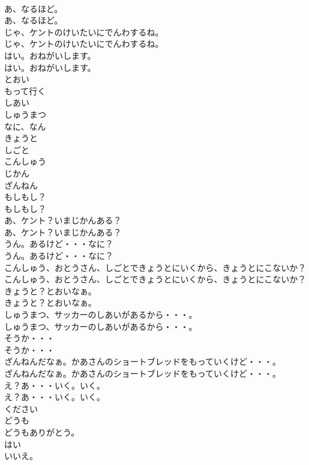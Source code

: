 \documentclass[8pt]{extreport}
\begin{document}
\begin{CJK}{UTF8}{min}
\\	あ、なるほど。	
\\	あ、なるほど。 
\\	じゃ、ケントのけいたいにでんわするね。	
\\	じゃ、ケントのけいたいにでんわするね。 
\\	はい。おねがいします。	
\\	はい。おねがいします。 
\\	とおい
\\	もって行く
\\	しあい
\\	しゅうまつ
\\	なに、なん
\\	きょうと
\\	しごと
\\	こんしゅう
\\	じかん
\\	ざんねん
\\	もしもし？	
\\	もしもし？ 
\\	あ、ケント？いまじかんある？	
\\	あ、ケント？いまじかんある？ 
\\	うん。あるけど・・・なに？	
\\	うん。あるけど・・・なに？ 
\\	こんしゅう、おとうさん、しごとできょうとにいくから、きょうとにこないか？	
\\	こんしゅう、おとうさん、しごとできょうとにいくから、きょうとにこないか？ 
\\	きょうと？とおいなぁ。	
\\	きょうと？とおいなぁ。 
\\	しゅうまつ、サッカーのしあいがあるから・・・。	
\\	しゅうまつ、サッカーのしあいがあるから・・・。 
\\	そうか・・・	
\\	そうか・・・ 
\\	ざんねんだなぁ。かあさんのショートブレッドをもっていくけど・・・。	
\\	ざんねんだなぁ。かあさんのショートブレッドをもっていくけど・・・。 
\\	え？あ・・・いく。いく。	
\\	え？あ・・・いく。いく。 
\\	ください
\\	どうも
\\	どうもありがとう。
\\	はい
\\	いいえ。

\end{CJK}
\end{document}
